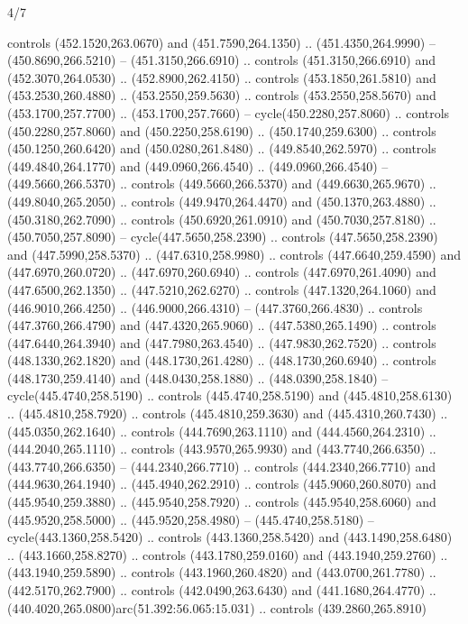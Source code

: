 \begin{flagdescription}{4/7}
\begin{scope}[shift={(0.5\flaglength,0.5\flagwidth)},scale=\flagwidth*\stretchfactor/820]
\begin{scope}[scale=1.87,xshift=-138mm,yshift=75mm]
\begin{scope}[y=0.8pt, x=0.8pt, yscale=-1, xscale=1]
\begin{scope}[fill=c816c2a]
  controls (452.1520,263.0670) and (451.7590,264.1350) .. (451.4350,264.9990) --
  (450.8690,266.5210) -- (451.3150,266.6910) .. controls (451.3150,266.6910) and
  (452.3070,264.0530) .. (452.8900,262.4150) .. controls (453.1850,261.5810) and
  (453.2530,260.4880) .. (453.2550,259.5630) .. controls (453.2550,258.5670) and
  (453.1700,257.7700) .. (453.1700,257.7660) -- cycle(450.2280,257.8060) ..
  controls (450.2280,257.8060) and (450.2250,258.6190) .. (450.1740,259.6300) ..
  controls (450.1250,260.6420) and (450.0280,261.8480) .. (449.8540,262.5970) ..
  controls (449.4840,264.1770) and (449.0960,266.4540) .. (449.0960,266.4540) --
  (449.5660,266.5370) .. controls (449.5660,266.5370) and (449.6630,265.9670) ..
  (449.8040,265.2050) .. controls (449.9470,264.4470) and (450.1370,263.4880) ..
  (450.3180,262.7090) .. controls (450.6920,261.0910) and (450.7030,257.8180) ..
  (450.7050,257.8090) -- cycle(447.5650,258.2390) .. controls
  (447.5650,258.2390) and (447.5990,258.5370) .. (447.6310,258.9980) .. controls
  (447.6640,259.4590) and (447.6970,260.0720) .. (447.6970,260.6940) .. controls
  (447.6970,261.4090) and (447.6500,262.1350) .. (447.5210,262.6270) .. controls
  (447.1320,264.1060) and (446.9010,266.4250) .. (446.9000,266.4310) --
  (447.3760,266.4830) .. controls (447.3760,266.4790) and (447.4320,265.9060) ..
  (447.5380,265.1490) .. controls (447.6440,264.3940) and (447.7980,263.4540) ..
  (447.9830,262.7520) .. controls (448.1330,262.1820) and (448.1730,261.4280) ..
  (448.1730,260.6940) .. controls (448.1730,259.4140) and (448.0430,258.1880) ..
  (448.0390,258.1840) -- cycle(445.4740,258.5190) .. controls
  (445.4740,258.5190) and (445.4810,258.6130) .. (445.4810,258.7920) .. controls
  (445.4810,259.3630) and (445.4310,260.7430) .. (445.0350,262.1640) .. controls
  (444.7690,263.1110) and (444.4560,264.2310) .. (444.2040,265.1110) .. controls
  (443.9570,265.9930) and (443.7740,266.6350) .. (443.7740,266.6350) --
  (444.2340,266.7710) .. controls (444.2340,266.7710) and (444.9630,264.1940) ..
  (445.4940,262.2910) .. controls (445.9060,260.8070) and (445.9540,259.3880) ..
  (445.9540,258.7920) .. controls (445.9540,258.6060) and (445.9520,258.5000) ..
  (445.9520,258.4980) -- (445.4740,258.5180) -- cycle(443.1360,258.5420) ..
  controls (443.1360,258.5420) and (443.1490,258.6480) .. (443.1660,258.8270) ..
  controls (443.1780,259.0160) and (443.1940,259.2760) .. (443.1940,259.5890) ..
  controls (443.1960,260.4820) and (443.0700,261.7780) .. (442.5170,262.7900) ..
  controls (442.0490,263.6430) and (441.1680,264.4770) ..
  (440.4020,265.0800)arc(51.392:56.065:15.031) .. controls (439.2860,265.8910)

\end{scope}
\end{scope}
\end{scope}
\end{scope}
\end{flagdescription}
